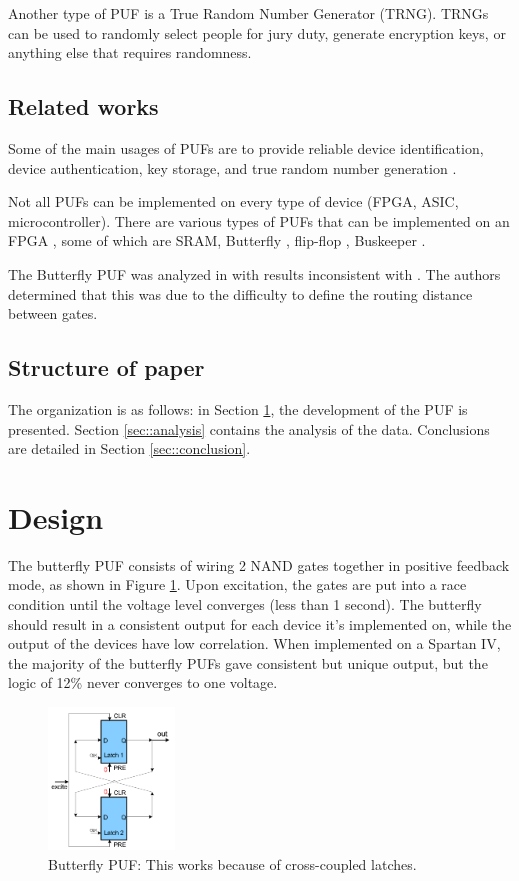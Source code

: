 	Another type of PUF is a True Random Number Generator (TRNG). TRNGs can be used to randomly select people for jury duty, generate encryption keys, or anything else that requires randomness. 

\subsection{Related works}

	Some of the main usages of PUFs are to provide reliable device identification, device authentication, key storage, and true random number generation \cite{tehranipoor2011introduction}. 

	Not all PUFs can be implemented on every type of device (FPGA, ASIC, microcontroller). There are various types of PUFs that can be implemented on an FPGA \cite{VanHerrewege2015}, some of which are SRAM, Butterfly \cite{Kumar2008}, flip-flop \cite{Maes2008,Leest2010}, Buskeeper \cite{Simons2012}. 

	The Butterfly PUF was analyzed in \cite{morozov2010analysis} with results inconsistent with \cite{Kumar2008}. The authors determined that this was due to the difficulty to define the routing distance between gates. 


\subsection{Structure of paper}
	The organization is as follows: in Section \ref{sec::des_impl}, the development of the PUF is presented.  
	Section \ref{sec::analysis} contains the analysis of the data. Conclusions are detailed in Section \ref{sec::conclusion}. 


\section{Design} \label{sec::des_impl}
	The butterfly PUF consists of wiring 2 NAND gates together in positive feedback mode, as shown in Figure \ref{fig:bfly}. Upon excitation, the gates are put into a race condition until the voltage level converges (less than 1 second). The butterfly should result in a consistent output for each device it's implemented on, while the output of the devices have low correlation. When implemented on a Spartan IV, the majority of the butterfly PUFs gave consistent but unique output, but the logic of 12\% never converges to one voltage. 
		\begin{figure}[tbph]
			\centering
			\includegraphics[width=0.3\textwidth]{bfly.png}
			\caption{Butterfly PUF: This works because of cross-coupled latches.}\label{fig:bfly}
		\end{figure}

